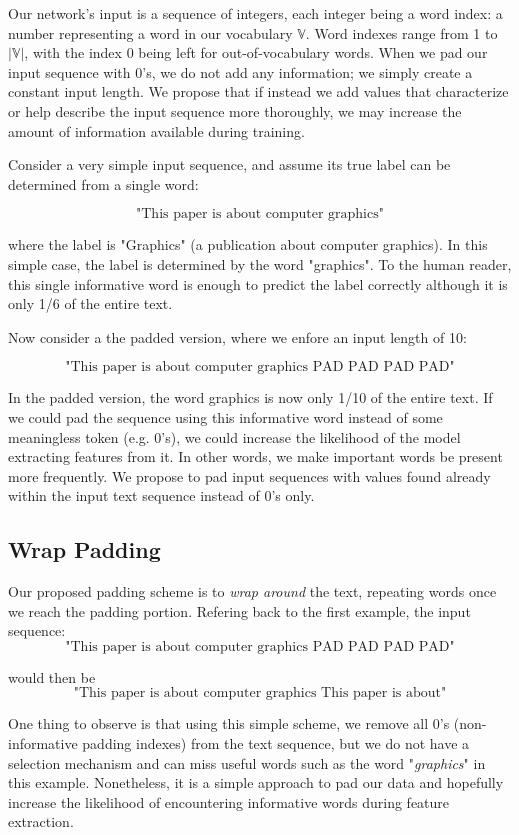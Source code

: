 Our network's input is a sequence of integers, each integer being a word index: a number representing a word in our vocabulary $\mathbb{V}$.
Word indexes range from 1 to $|\mathbb{V}|$, with the index 0 being left for out-of-vocabulary words.
When we pad our input sequence with 0’s, we do not add any information; we
simply create a constant input length. We propose that if instead we add values that characterize or help
describe the input sequence more thoroughly, we may increase the amount of information available during training.

Consider a very simple input sequence, and assume its true label can be determined
from a single word:

\[\text{"This paper is about computer graphics"}\]

where the label is "Graphics" (a publication about computer graphics).
In this simple case, the label is determined by the word "graphics". To the human reader, this single informative word
is enough to predict the label correctly although it is only 1/6 of the entire text.

Now consider a the padded version, where we enfore an input length of 10:

\[\text{"This paper is about computer graphics PAD PAD PAD PAD"}\]

In the padded version, the word graphics is now only 1/10 of the entire text. If we
could pad the sequence using this informative word instead of some
meaningless token (e.g. 0's), we could increase the likelihood of the model extracting features from it. In other
words, we make important words be present more frequently.
We propose to pad input sequences with values found already within the
input text sequence instead of 0's only.

\subsection{Wrap Padding}
Our proposed padding scheme is to \textit{wrap around} the text, repeating words once we reach the padding portion.
Refering back to the first example, the input sequence:
\[\text{"This paper is about computer graphics PAD PAD PAD PAD"}\]

would then be
\[\text{"This paper is about computer graphics This paper is about"}\]

One thing to observe is that using this simple scheme, we remove all 0's (non-informative padding indexes)
from the text sequence, but we do not have a selection mechanism and can miss useful words such as the
word "\textit{graphics}" in this example. Nonetheless, it is a simple approach to pad our data and hopefully increase the likelihood of encountering informative
words during feature extraction.


